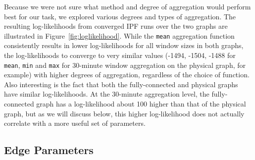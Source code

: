 Because we were not sure what method and degree of aggregation would perform best for our task, we explored various degrees and types of aggregation.
The resulting log-likelihoods from converged IPF runs over the two graphs are illustrated in Figure~\ref{fig:loglikelihood}.
While the \texttt{mean} aggregation function consistently results in lower log-likelihoods for all window sizes in both graphs, the log-likelihoods to converge to very similar values (-1494, -1504, -1488 for \texttt{mean}, \texttt{min} and \texttt{max} for 30-minute window aggregation on the physical graph, for example) with higher degrees of aggregation, regardless of the choice of function.
Also interesting is the fact that both the fully-connected and physical graphs have similar log-likelihoods.
At the 30-minute aggregation level, the fully-connected graph has a log-likelihood about 100 higher than that of the physical graph, but as we will discuss below, this higher log-likelihood does not actually correlate with a more useful set of parameters.

\subsection{Edge Parameters}

